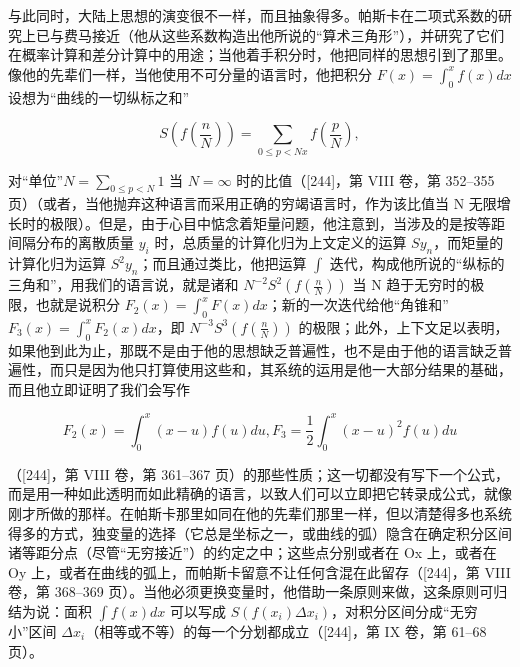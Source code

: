 与此同时，大陆上思想的演变很不一样，而且抽象得多。帕斯卡在二项式系数的研究上已与费马接近（他从这些系数构造出他所说的“算术三角形”），并研究了它们在概率计算和差分计算中的用途；当他着手积分时，他把同样的思想引到了那里。像他的先辈们一样，当他使用不可分量的语言时，他把积分 \(F(x) = \int_{0}^{x} f(x) dx\) 设想为“曲线的一切纵标之和”

\[
S \left(f \left(\frac {n}{N}\right)\right) = \sum_ {0 \leq p <   N x} f \left(\frac {p}{N}\right),
\]

对“单位”\(N = \sum_{0 \leq p < N} 1\) 当 \(N = \infty\) 时的比值（{[}244{]}，第 VIII 卷，第 352–355 页）（或者，当他抛弃这种语言而采用正确的穷竭语言时，作为该比值当 N 无限增长时的极限）。但是，由于心目中惦念着矩量问题，他注意到，当涉及的是按等距间隔分布的离散质量 \(y_{i}\) 时，总质量的计算化归为上文定义的运算 \(Sy_{n}\)，而矩量的计算化归为运算 \(S^{2}y_{n}\)；而且通过类比，他把运算 \(\int\) 迭代，构成他所说的“纵标的三角和”，用我们的语言说，就是诸和 \(N^{-2}S^{2}\left(f\left(\frac{n}{N}\right)\right)\) 当 N 趋于无穷时的极限，也就是说积分 \(F_{2}(x) = \int_{0}^{x} F(x)dx\)；新的一次迭代给他“角锥和”\(F_{3}(x) = \int_{0}^{x} F_{2}(x)dx\)，即 \(N^{-3}S^{3}\left(f\left(\frac{n}{N}\right)\right)\) 的极限；此外，上下文足以表明，如果他到此为止，那既不是由于他的思想缺乏普遍性，也不是由于他的语言缺乏普遍性，而只是因为他只打算使用这些和，其系统的运用是他一大部分结果的基础，而且他立即证明了我们会写作

\[
F _ {2} (x) = \int_ {0} ^ {x} (x - u) f (u) d u, F _ {3} = \frac {1}{2} \int_ {0} ^ {x} (x - u) ^ {2} f (u) d u
\]

（{[}244{]}，第 VIII 卷，第 361–367 页）的那些性质；这一切都没有写下一个公式，而是用一种如此透明而如此精确的语言，以致人们可以立即把它转录成公式，就像刚才所做的那样。在帕斯卡那里如同在他的先辈们那里一样，但以清楚得多也系统得多的方式，独变量的选择（它总是坐标之一，或曲线的弧）隐含在确定积分区间诸等距分点（尽管“无穷接近”）的约定之中；这些点分别或者在 Ox 上，或者在 Oy 上，或者在曲线的弧上，而帕斯卡留意不让任何含混在此留存（{[}244{]}，第 VIII 卷，第 368–369 页）。当他必须更换变量时，他借助一条原则来做，这条原则可归结为说：面积 \(\int f(x)dx\) 可以写成 \(S(f(x_i)\Delta x_i)\)，对积分区间分成“无穷小”区间 \(\Delta x_i\)（相等或不等）的每一个分划都成立（{[}244{]}，第 IX 卷，第 61–68 页）。

